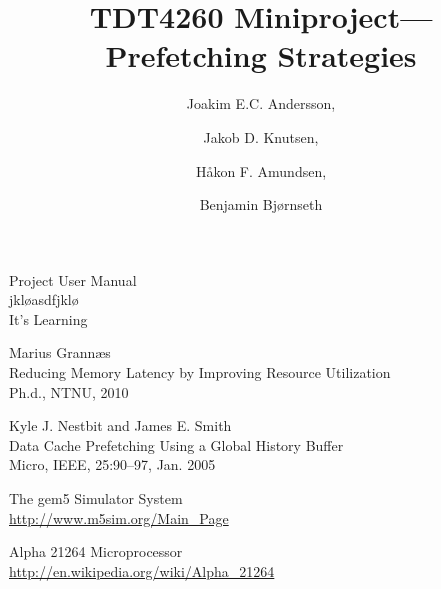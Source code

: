 \documentclass[journal]{IEEEtran/IEEEtran}
\title{TDT4260 Miniproject---Prefetching Strategies}
\author{Joakim E.C. Andersson, \and Jakob D. Knutsen, \and Håkon F. Amundsen, \and Benjamin Bjørnseth}
\begin{document}
\maketitle











\begin{thebibliography}{9}

Project User Manual\\
jkløasdfjklø\\
It's Learning

Marius Grannæs\\
Reducing Memory Latency by Improving Resource Utilization\\
Ph.d., NTNU, 2010

Kyle J. Nestbit and James E. Smith\\
Data Cache Prefetching Using a Global History Buffer\\
Micro, IEEE, 25:90–97, Jan. 2005

The gem5 Simulator System\\
\url{http://www.m5sim.org/Main_Page}

Alpha 21264 Microprocessor\\
\url{http://en.wikipedia.org/wiki/Alpha_21264}

\end{thebibliography}
\end{document}
